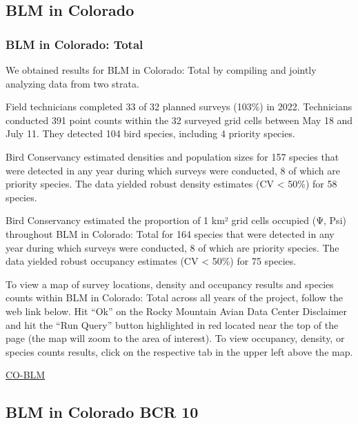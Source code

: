 \documentclass[
  letterpaper,
  DIV=11,
  numbers=noendperiod,
  oneside]{scrreprt}
\begin{document}
\hypertarget{blm-in-colorado}{%
\subsection{BLM in Colorado}\label{blm-in-colorado}}

\hypertarget{blm-in-colorado-total}{%
\subsubsection{BLM in Colorado: Total}\label{blm-in-colorado-total}}

We obtained results for BLM in Colorado: Total by compiling and jointly
analyzing data from two strata.

Field technicians completed 33 of 32 planned surveys (103\%) in 2022.
Technicians conducted 391 point counts within the 32 surveyed grid cells
between May 18 and July 11. They detected 104 bird species, including 4
priority species.

Bird Conservancy estimated densities and population sizes for 157
species that were detected in any year during which surveys were
conducted, 8 of which are priority species. The data yielded robust
density estimates (CV \textless{} 50\%) for 58 species.

Bird Conservancy estimated the proportion of 1 km² grid cells occupied
(Ψ, Psi) throughout BLM in Colorado: Total for 164 species that were
detected in any year during which surveys were conducted, 8 of which are
priority species. The data yielded robust occupancy estimates (CV
\textless{} 50\%) for 75 species.

To view a map of survey locations, density and occupancy results and
species counts within BLM in Colorado: Total across all years of the
project, follow the web link below. Hit ``Ok'' on the Rocky Mountain
Avian Data Center Disclaimer and hit the ``Run Query'' button
highlighted in red located near the top of the page (the map will zoom
to the area of interest). To view occupancy, density, or species counts
results, click on the respective tab in the upper left above the map.

\href{http://www.rmbo.org/new_site/adc/QueryWindow.aspx\#N4IgzgrgDgpgTmALnAhoiBbEAuABCAYQHkBaAIQBkBZEAXyA}{CO-BLM}

\hypertarget{blm-in-colorado-bcr-10}{%
\subsection{BLM in Colorado BCR 10}\label{blm-in-colorado-bcr-10}}
\end{document}
